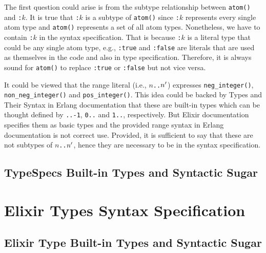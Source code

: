 \documentclass{article}
\begin{document}
The first question could arise is from the subtype relationship between \texttt{atom()} and \texttt{:$k$}.
It is true that \texttt{:$k$} is a subtype of \texttt{atom()} since \texttt{:$k$} represents every single atom type and \texttt{atom()} represents a set of all atom types.
Nonetheless, we have to contain \texttt{:$k$} in the syntax specification.
That is because \texttt{:$k$} is a literal type that could be any single atom type, e.g., \texttt{:true} and \texttt{:false} are literals that are used as themselves in the code and also in type specification.
Therefore, it is always sound for \texttt{atom()} to replace \texttt{:true} or \texttt{:false} but not vice versa.


It could be viewed that the range literal (i.e., \texttt{$n$..$n^{\prime}$}) expresses \texttt{neg\_integer()}, \texttt{non\_neg\_integer()} and \texttt{pos\_integer()}.
This idea could be backed by Types and Their Syntax in Erlang documentation that these are built-in types which can be thought defined by \texttt{..-1}, \texttt{0..} and \texttt{1..}, respectively.
But Elixir documentation specifies them as basic types and the provided range syntax in Erlang documentation is not correct use.
Provided, it is sufficient to say that these are not subtypes of \texttt{$n$..$n^{\prime}$}, hence they are necessary to be in the syntax specification.



 


\subsection{TypeSpecs Built-in Types and Syntactic Sugar}








\section{Elixir Types Syntax Specification}


\subsection{Elixir Type Built-in Types and Syntactic Sugar}
\end{document}
